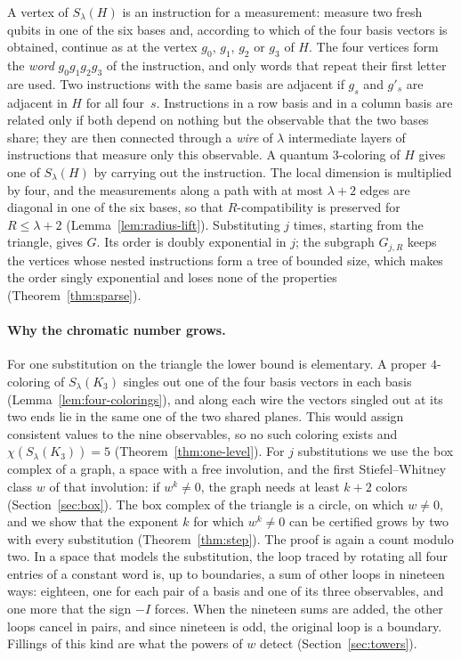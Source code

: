 A vertex of $S_\lambda(H)$ is an instruction for a measurement: measure two fresh qubits in one of the six bases and, according to which of the four basis vectors is obtained, continue as at the vertex $g_0$, $g_1$, $g_2$ or $g_3$ of $H$. The four vertices form the \emph{word} $g_0g_1g_2g_3$ of the instruction, and only words that repeat their first letter are used. Two instructions with the same basis are adjacent if $g_s$ and $g'_s$ are adjacent in $H$ for all four~$s$. Instructions in a row basis and in a column basis are related only if both depend on nothing but the observable that the two bases share; they are then connected through a \emph{wire} of $\lambda$ intermediate layers of instructions that measure only this observable. A quantum $3$-coloring of $H$ gives one of $S_\lambda(H)$ by carrying out the instruction. The local dimension is multiplied by four, and the measurements along a path with at most $\lambda+2$ edges are diagonal in one of the six bases, so that $R$-compatibility is preserved for $R\le\lambda+2$ (Lemma~\ref{lem:radius-lift}). Substituting $j$ times, starting from the triangle, gives $G$. Its order is doubly exponential in $j$; the subgraph $G_{j,R}$ keeps the vertices whose nested instructions form a tree of bounded size, which makes the order singly exponential and loses none of the properties (Theorem~\ref{thm:sparse}).

\paragraph{Why the chromatic number grows.}
For one substitution on the triangle the lower bound is elementary. A proper $4$-coloring of $S_\lambda(K_3)$ singles out one of the four basis vectors in each basis (Lemma~\ref{lem:four-colorings}), and along each wire the vectors singled out at its two ends lie in the same one of the two shared planes. This would assign consistent values to the nine observables, so no such coloring exists and $\chi(S_\lambda(K_3))=5$ (Theorem~\ref{thm:one-level}). For $j$ substitutions we use the box complex of a graph, a space with a free involution, and the first Stiefel--Whitney class $w$ of that involution: if $w^k\ne0$, the graph needs at least $k+2$ colors (Section~\ref{sec:box}). The box complex of the triangle is a circle, on which $w\ne0$, and we show that the exponent $k$ for which $w^k\ne0$ can be certified grows by two with every substitution (Theorem~\ref{thm:step}). The proof is again a count modulo two. In a space that models the substitution, the loop traced by rotating all four entries of a constant word is, up to boundaries, a sum of other loops in nineteen ways: eighteen, one for each pair of a basis and one of its three observables, and one more that the sign $-I$ forces. When the nineteen sums are added, the other loops cancel in pairs, and since nineteen is odd, the original loop is a boundary. Fillings of this kind are what the powers of $w$ detect (Section~\ref{sec:towers}).

